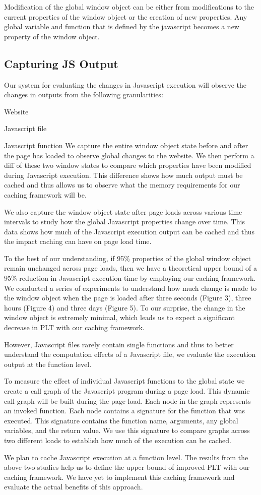  
Modification of the global window object can be either from modifications to the current properties of the window
object or the creation of new properties. Any global variable
and function that is defined by the javascript becomes a new property of the window object.

\subsection{Capturing JS Output}
\label{sec:exec-output}

Our system for evaluating the changes in Javascript execution will observe the changes in outputs from the following granularities:  
\squishenum
\item Website
\item Javascript file 
\item Javascript function
\squishenumend
We capture the entire window object state
before and after the page has loaded to observe global changes to the website. We then perform a diff of these
two window states to compare which properties have been modified during Javascript execution. This difference shows how much output must be cached and thus allows us to observe what the memory requirements for our caching framework will be.

We also capture the window object state after page loads across various time intervals to study how the global Javascript properties change over time. This data shows how much of the Javascript execution output can be cached and thus the impact caching can have on  
page load time. 

To the best of our understanding, if 95\% properties of the global window object remain unchanged across page loads, then we have a theoretical upper bound of a 95\% reduction in 
Javascript execution time by employing our caching framework. We conducted a series of experiments 
to understand how much change is made to the window object when the page is loaded after three seconds (Figure 3),
three hours (Figure 4) and three days (Figure 5). 
To our surprise, the change in the window object is extremely minimal, which leads us to expect a significant decrease in PLT
with our caching framework. 

However, Javascript files rarely contain single functions and thus to better understand the computation
effects of a Javascript file, we evaluate the execution output at the function level. 

To measure the effect of individual Javascript functions to the global state we create a call graph of the Javascript program during a page load. This dynamic call graph will be built during the page load. Each node
in the graph represents an invoked function. Each node contains a signature for the function that was executed. 
This signature contains the function name, arguments, any global variables,
and the return value. We use this signature to compare graphs across two different loads to 
establish how much of the execution can be cached. 


We plan to cache Javascript execution at a function level. The results from the above two studies
help us to define the upper bound of improved PLT with our caching framework. 
We have yet to implement this caching framework and evaluate the actual benefits of this approach.
